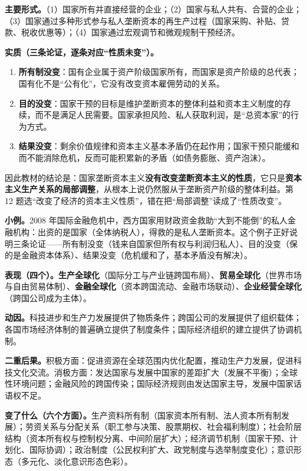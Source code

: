 \documentclass[11pt]{ctexart}
\newcommand{\dw}[1]{\textbf{\color{violetdeep}#1}}   %
\let\origsubhdr\subhdr
\renewcommand{\subhdr}[1]{\par\needspace{4\baselineskip}\origsubhdr{#1}}
\begin{document}
\textbf{主要形式。}（1）国家所有并直接经营的企业；（2）国家与私人共有、合营的企业；（3）国家通过多种形式参与私人垄断资本的再生产过程（国家采购、补贴、贷款、税收优惠等）；（4）国家通过宏观调节和微观规制干预经济。

\textbf{实质（三条论证，逐条对应“性质未变”）。}

\begin{enumerate}[label=\arabic*.,leftmargin=2.0em]
\item \dw{所有制没变}：国有企业属于资产阶级国家所有，而国家是资产阶级的总代表；国有化不是“公有化”，它没有改变资本雇佣劳动的关系。
\item \dw{目的没变}：国家干预的目标是维护垄断资本的整体利益和资本主义制度的存续，而不是满足人民需要。国家承担风险、私人获取利润，是“总资本家”的行为方式。
\item \dw{结果没变}：剩余价值规律和资本主义基本矛盾仍在起作用；国家干预只能缓和而不能消除危机，反而可能积累新的矛盾（如债务膨胀、资产泡沫）。
\end{enumerate}

因此教材的结论是：国家垄断资本主义\dw{没有改变垄断资本主义的性质}，它只是\dw{资本主义生产关系的局部调整}，从根本上说仍然服从于垄断资产阶级的整体利益。第 12 题选“改变了经济的资本主义性质”，错在把“局部调整”读成了“性质改变”。

\textbf{小例。}2008 年国际金融危机中，西方国家用财政资金救助“大到不能倒”的私人金融机构：出资的是国家（全体纳税人），得救的是私人垄断资本。这个例子正好说明三条论证——所有制没变（钱来自国家但所有权与利润归私人）、目的没变（保的是金融资本体系）、结果没变（危机缓和了，基本矛盾没有解决）。


\textbf{表现（四个）。}\dw{生产全球化}（国际分工与产业链跨国布局）、\dw{贸易全球化}（世界市场与自由贸易体制）、\dw{金融全球化}（资本跨国流动、金融市场联动）、\dw{企业经营全球化}（跨国公司成为主体）。

\textbf{动因。}科技进步和生产力发展提供了物质条件；跨国公司的发展提供了组织载体；各国市场经济体制的普遍确立提供了制度条件；国际经济组织的建立提供了协调机制。

\textbf{二重后果。}积极方面：促进资源在全球范围内优化配置，推动生产力发展，促进科技文化交流。消极方面：发达国家与发展中国家的差距扩大（发展不平衡）；全球性环境问题；金融风险的跨国传染；国际经济规则由发达国家主导，发展中国家话语权不足。


\textbf{变了什么（六个方面）。}生产资料所有制（国家资本所有制、法人资本所有制发展）；劳资关系与分配关系（职工参与决策、股票期权、社会福利制度）；社会阶层结构（资本所有权与控制权分离、中间阶层扩大）；经济调节机制（国家干预、计划化、国际协调）；政治制度（公民权利扩大、政党制度与选举制度变化）；意识形态（多元化、淡化意识形态色彩）。
\end{document}
